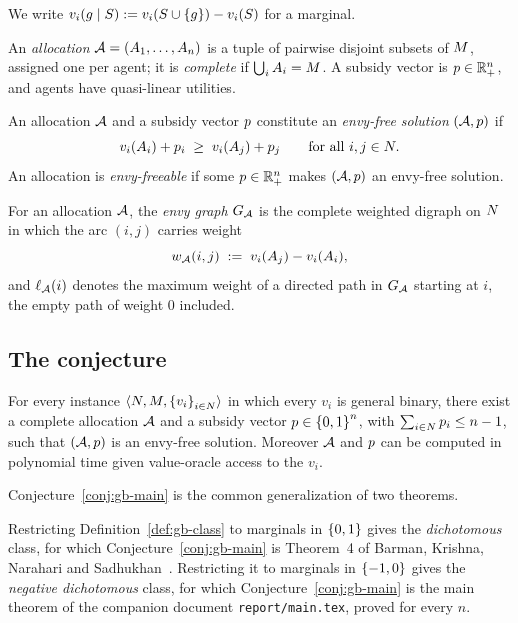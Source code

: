 We write $v_i(g \mid S) := v_i(S \cup \left\{g\right\}) - v_i(S)$ for a marginal.

An \emph{allocation} $\mathcal{A} = (A_{1},\dots,A_{n})$ is a tuple of
pairwise disjoint subsets of $M$, assigned one per agent; it is
\emph{complete} if $\bigcup_i A_{i} = M$. A subsidy vector is
$p \in \mathbb{R}^n_{+}$, and agents have quasi-linear utilities.

\begin{definition}
\label{def:gb-efsolution}
An allocation $\mathcal{A}$ and a subsidy vector $p$ constitute an
\emph{envy-free solution} $(\mathcal{A},p)$ if
\[
  v_i(A_{i}) + p_i \;\ge\; v_i(A_{j}) + p_j
  \qquad\text{for all } i,j \in N .
\]
An allocation is \emph{envy-freeable} if some $p \in \mathbb{R}^n_+$ makes
$(\mathcal{A},p)$ an envy-free solution.
\end{definition}

For an allocation $\mathcal{A}$, the \emph{envy graph} $G_{\mathcal{A}}$ is the
complete weighted digraph on $N$ in which the arc $(i,j)$ carries weight
\begin{equation}
\label{eq:gb-arc}
  w_{\mathcal{A}}(i,j) \;:=\; v_i(A_{j}) - v_i(A_{i}),
\end{equation}
and $\ell_{\mathcal{A}}(i)$ denotes the maximum weight of a directed path in
$G_{\mathcal{A}}$ starting at $i$, the empty path of weight $0$ included.

\subsection{The conjecture}
\label{sec:gb-conjecture}

\begin{conjecture}
\label{conj:gb-main}
For every instance $\langle N, M, \left\{v_i\right\}_{i \in N}\rangle$
in which every $v_i$ is general binary, there exist a complete allocation
$\mathcal{A}$ and a subsidy vector $p \in \left\{0,1\right\}^n$, with
$\sum_{i \in N} p_i \le n-1$, such that $(\mathcal{A},p)$ is an
envy-free solution. Moreover $\mathcal{A}$ and $p$ can be computed in
polynomial time given value-oracle access to the $v_i$.
\end{conjecture}

Conjecture~\ref{conj:gb-main} is the common generalization of two theorems.

\begin{observation}
\label{obs:gb-boundary}
Restricting Definition~\ref{def:gb-class} to marginals in $\left\{0,1\right\}$ gives the
\emph{dichotomous} class, for which Conjecture~\ref{conj:gb-main} is Theorem~4
of Barman, Krishna, Narahari and Sadhukhan~\cite{BKNS22}. Restricting it to
marginals in $\left\{-1,0\right\}$ gives the \emph{negative dichotomous} class, for
which Conjecture~\ref{conj:gb-main} is the main theorem of the companion
document \texttt{report/main.tex}, proved for every $n$.
\end{observation}

